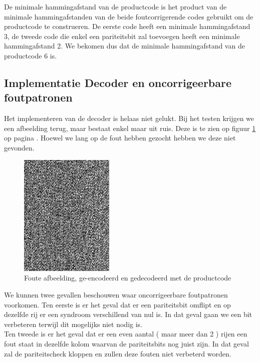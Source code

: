 \documentclass[11pt,a4paper]{article}
\begin{document}
De minimale hammingafstand van de productcode is het product van de minimale hammingafstanden van de beide foutcorrigerende codes gebruikt om de productcode te construeren. De eerste code heeft een minimale hammingafstand 3, de tweede code die enkel een pariteitsbit zal toevoegen heeft een minimale hammingafstand 2. We bekomen dus dat de minimale hammingafstand van de productcode 6 is.

\subsection{Implementatie Decoder en oncorrigeerbare foutpatronen}
Het implementeren van de decoder is helaas niet gelukt. Bij het testen krijgen we een afbeelding terug, maar bestaat enkel maar uit ruis. Deze is te zien op figuur \ref{fig:3_2_7_3_fout} op pagina \pageref{fig:3_2_7_3_fout}. Hoewel we lang op de fout hebben gezocht hebben we deze niet gevonden.

\begin{figure}[h!]
  		\centering
   		\includegraphics[width=0.4\textwidth]{3_2_7_3.pdf}
  		\caption{Foute afbeelding, ge-encodeerd en gedecodeerd met de productcode}
  		\label{fig:3_2_7_3_fout}
\end{figure}

We kunnen twee gevallen beschouwen waar oncorrigeerbare foutpatronen voorkomen.
Ten eerste is er het geval dat er een pariteitsbit omflipt en op dezelfde rij er een syndroom verschillend van nul is. In dat geval gaan we een bit verbeteren terwijl dit mogelijks niet nodig is. \\
Ten tweede is er het geval dat er een even aantal ( maar meer dan 2 ) rijen een fout staat in dezelfde kolom waarvan de pariteitsbits nog juist zijn. In dat geval zal de pariteitscheck kloppen en zullen deze fouten niet verbeterd worden. 
\end{document}
